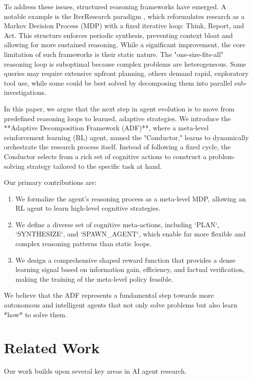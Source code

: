 \documentclass{article}
\begin{document}
To address these issues, structured reasoning frameworks have emerged. A notable example is the IterResearch paradigm \cite{qiao2025webresearcher}, which reformulates research as a Markov Decision Process (MDP) with a fixed iterative loop: Think, Report, and Act. This structure enforces periodic synthesis, preventing context bloat and allowing for more sustained reasoning. While a significant improvement, the core limitation of such frameworks is their static nature. The "one-size-fits-all" reasoning loop is suboptimal because complex problems are heterogeneous. Some queries may require extensive upfront planning, others demand rapid, exploratory tool use, while some could be best solved by decomposing them into parallel sub-investigations.

In this paper, we argue that the next step in agent evolution is to move from predefined reasoning loops to learned, adaptive strategies. We introduce the **Adaptive Decomposition Framework (ADF)**, where a meta-level reinforcement learning (RL) agent, named the "Conductor," learns to dynamically orchestrate the research process itself. Instead of following a fixed cycle, the Conductor selects from a rich set of cognitive actions to construct a problem-solving strategy tailored to the specific task at hand.

Our primary contributions are:
\begin{enumerate}
    \item We formalize the agent's reasoning process as a meta-level MDP, allowing an RL agent to learn high-level cognitive strategies.
    \item We define a diverse set of cognitive meta-actions, including `PLAN`, `SYNTHESIZE`, and `SPAWN_AGENT`, which enable far more flexible and complex reasoning patterns than static loops.
    \item We design a comprehensive shaped reward function that provides a dense learning signal based on information gain, efficiency, and factual verification, making the training of the meta-level policy feasible.
\end{enumerate}
We believe that the ADF represents a fundamental step towards more autonomous and intelligent agents that not only solve problems but also learn *how* to solve them.

\section{Related Work}
Our work builds upon several key areas in AI agent research.
\end{document}
